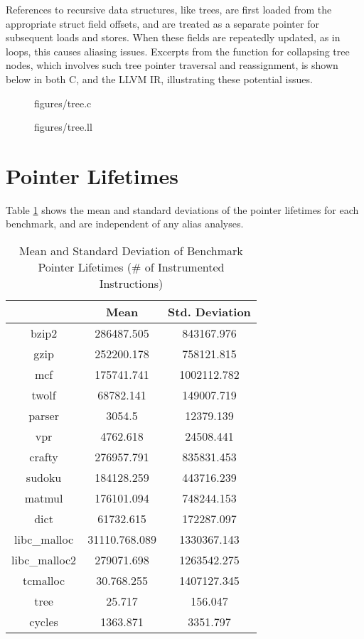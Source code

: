 References to recursive data structures, like trees, are first loaded from the appropriate struct field offsets, and are treated as a separate pointer for subsequent loads and stores. When these fields are repeatedly updated, as in loops, this causes aliasing issues. Excerpts from the function for collapsing tree nodes, which involves such tree pointer traversal and reassignment, is shown below in both C, and the LLVM IR, illustrating these potential issues.

\begin{figure} [h!]
   {figures/tree.c}
  \label{fig:treec}
\end{figure}

\begin{figure} [h!]
   {figures/tree.ll}
  \label{fig:treell}
\end{figure}

\section{Pointer Lifetimes}
Table \ref{table:4} shows the mean and standard deviations of the pointer lifetimes for each benchmark, and are independent of any alias analyses.

\begin{table} [h!]
\centering
   \begin{tabular} {|c|c c|}
      \hline
      & Mean & Std. Deviation \\
      \hline
	   bzip2 & 286487.505 & 843167.976 \\
      \hline
	   gzip & 252200.178 & 758121.815 \\
      \hline
           mcf & 175741.741 & 1002112.782 \\
      \hline
	   twolf & 68782.141 & 149007.719 \\
      \hline
	   parser & 3054.5 & 12379.139 \\
      \hline
	   vpr & 4762.618 & 24508.441 \\
      \hline
	   crafty & 276957.791 & 835831.453 \\
      \hline
	   sudoku & 184128.259 & 443716.239 \\
      \hline
	   matmul & 176101.094 & 748244.153 \\
      \hline
	   dict & 61732.615 & 172287.097 \\
      \hline
	   libc\_malloc & 31110.768.089 & 1330367.143 \\
      \hline
	   libc\_malloc2 & 279071.698 & 1263542.275 \\
      \hline
	   tcmalloc & 30.768.255 & 1407127.345 \\
      \hline
	   tree & 25.717 & 156.047 \\
      \hline
	   cycles & 1363.871 & 3351.797 \\
      \hline
   \end{tabular}
   \caption{Mean and Standard Deviation of Benchmark Pointer Lifetimes (# of Instrumented Instructions)}
   \label{table:4}
\end{table}

